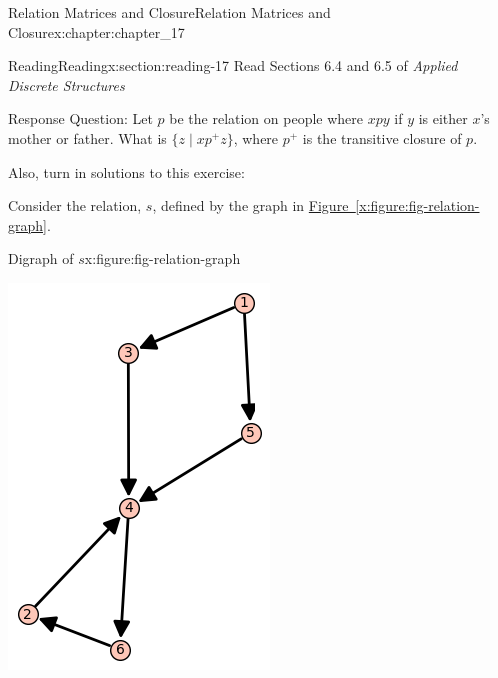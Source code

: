 \documentclass[oneside,10pt,]{book}
\newcommand{\xreffont}{\relax}
\numberwithin{equation}{section}
\begin{document}
\begin{chapterptx}{Relation Matrices and Closure}{}{Relation Matrices and Closure}{}{}{x:chapter:chapter_17}
\index{}%
%
%
\typeout{************************************************}
\typeout{************************************************}
%
\begin{sectionptx}{Reading}{}{Reading}{}{}{x:section:reading-17}
Read Sections 6.4 and 6.5 of \emph{Applied Discrete Structures}%
\par
Response Question: Let \(p\) be the relation on people where \(x p y\) if \(y\) is either \(x\)'s mother or father.   What is \(\{z \mid x p^+ z\}\), where \(p^+\) is the transitive closure of \(p\).%
\par
Also, turn in solutions to this exercise:%
\par
Consider the relation, \(s\), defined by the graph in \hyperref[x:figure:fig-relation-graph]{Figure~{\xreffont\ref{x:figure:fig-relation-graph}}}.%
\begin{figureptx}{Digraph of \(s\)}{x:figure:fig-relation-graph}{}%
\begin{image}{0.25}{0.5}{0.25}%
\includegraphics[width=\linewidth]{images/fig-relation-graph.png}

\end{image}
\end{figureptx}
\end{sectionptx}
\end{chapterptx}
\end{document}
